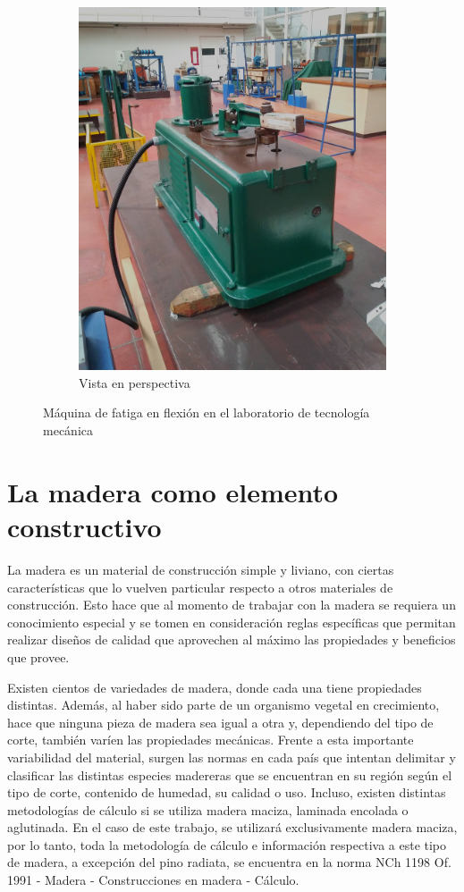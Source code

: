 \begin{figure}[h]
\begin{subfigure}{0.5\linewidth}
		\includegraphics[width=0.8\linewidth]{Imagenes/maq_iso.jpg}
		\caption{Vista en perspectiva}\label{fig:maq_iso}		
	\end{subfigure}
\caption{Máquina de fatiga en flexión en el laboratorio de tecnología mecánica}
\label{fig:maq_fat}
\end{figure}

\newpage

\section{La madera como elemento constructivo}
La madera es un material de construcción simple y liviano, con ciertas características que lo vuelven particular respecto a otros materiales de construcción. Esto hace que al momento de trabajar con la madera se requiera un conocimiento especial y se tomen en consideración reglas específicas que permitan realizar diseños de calidad que aprovechen al máximo las propiedades y beneficios que provee.

Existen cientos de variedades de madera, donde cada una tiene propiedades distintas. Además, al haber sido parte de un organismo vegetal en crecimiento, hace que ninguna pieza de madera sea igual a otra y, dependiendo del tipo de corte, también varíen las propiedades mecánicas. Frente a esta importante variabilidad del material, surgen las normas en cada país que intentan delimitar y clasificar las distintas especies madereras que se encuentran en su región según el tipo de corte, contenido de humedad, su calidad o uso. Incluso, existen distintas metodologías de cálculo si se utiliza madera maciza, laminada encolada o aglutinada. En el caso de este trabajo, se utilizará exclusivamente madera maciza, por lo tanto, toda la metodología de cálculo e información respectiva a este tipo de madera, a excepción del pino radiata, se encuentra en la norma NCh 1198 Of. 1991 - Madera - Construcciones en madera - Cálculo.

